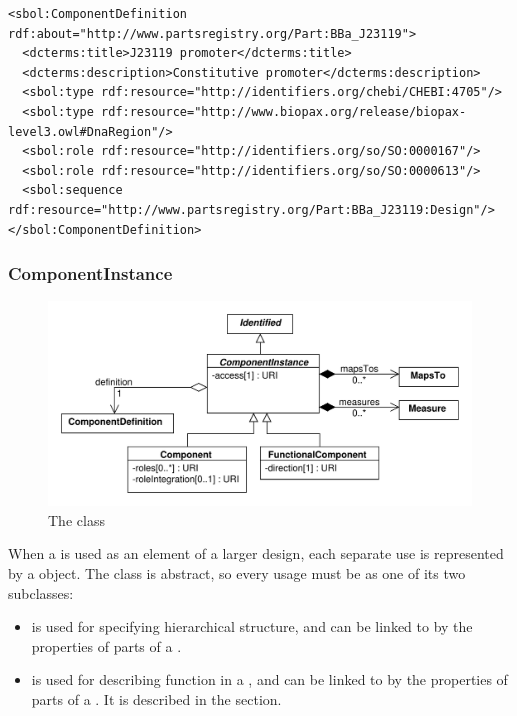 \begin{lstlisting}
<sbol:ComponentDefinition rdf:about="http://www.partsregistry.org/Part:BBa_J23119">
  <dcterms:title>J23119 promoter</dcterms:title>
  <dcterms:description>Constitutive promoter</dcterms:description>
  <sbol:type rdf:resource="http://identifiers.org/chebi/CHEBI:4705"/>
  <sbol:type rdf:resource="http://www.biopax.org/release/biopax-level3.owl#DnaRegion"/>
  <sbol:role rdf:resource="http://identifiers.org/so/SO:0000167"/>
  <sbol:role rdf:resource="http://identifiers.org/so/SO:0000613"/>
  <sbol:sequence rdf:resource="http://www.partsregistry.org/Part:BBa_J23119:Design"/>
</sbol:ComponentDefinition>
\end{lstlisting}


\subsubsection{ComponentInstance}
\label{sec:ComponentInstance}

\begin{figure}[ht]
\begin{center}
\includegraphics[scale=0.6]{uml/component_instance}
\caption[]{The  class}
\label{uml:component}
\end{center}
\end{figure}

When a  is used as an element of a larger design, each separate use is represented by a  object.  
The  class is abstract, so every usage must be as one of its two subclasses:
\begin{itemize}
\item {} is used for specifying hierarchical structure, and can be linked to by the properties of parts of a .
\item {} is used for describing function in a , and can be linked to by the properties of parts of a .  It is described in the  section.
\end{itemize}

